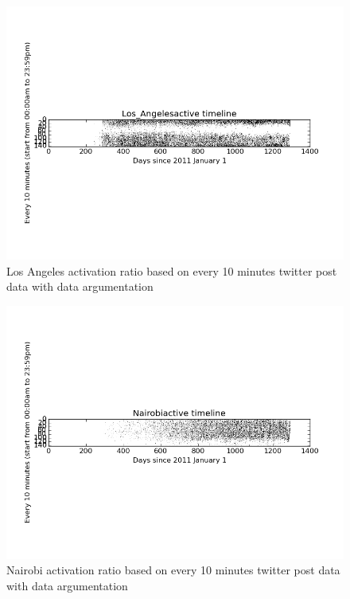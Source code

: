 \documentclass[a4paper,12pt]{article}
\begin{document}
 
 \begin{figure}[H]
  \begin{center}
      \includegraphics[scale=0.8]{Los_Angelesbinary3.png}
\end{center}
\caption{Los Angeles activation ratio based on every 10 minutes twitter post data  with data argumentation}
 \label {fig:2}
 \end{figure}




 

 
 
  \begin{figure}[H]
  \begin{center}
      \includegraphics[scale=0.8]{Nairobibinary3.png}
\end{center}
\caption{Nairobi activation ratio based on every 10 minutes twitter post data  with data argumentation}
 \label {fig:2}
 \end{figure}
 
\end{document}
